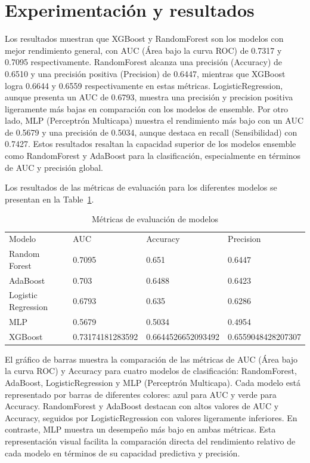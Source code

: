 \documentclass[
  number,
  preprint,
  3p,
  twocolumn]{elsarticle}
\begin{document}
\section{Experimentación y
resultados}\label{experimentaciuxf3n-y-resultados}

Los resultados muestran que XGBoost y RandomForest son los modelos con
mejor rendimiento general, con AUC (Área bajo la curva ROC) de 0.7317 y
0.7095 respectivamente. RandomForest alcanza una precisión (Accuracy) de
0.6510 y una precisión positiva (Precision) de 0.6447, mientras que
XGBoost logra 0.6644 y 0.6559 respectivamente en estas métricas.
LogisticRegression, aunque presenta un AUC de 0.6793, muestra una
precisión y precision positiva ligeramente más bajas en comparación con
los modelos de ensemble. Por otro lado, MLP (Perceptrón Multicapa)
muestra el rendimiento más bajo con un AUC de 0.5679 y una precisión de
0.5034, aunque destaca en recall (Sensibilidad) con 0.7427. Estos
resultados resaltan la capacidad superior de los modelos ensemble como
RandomForest y AdaBoost para la clasificación, especialmente en términos
de AUC y precisión global.

Los resultados de las métricas de evaluación para los diferentes modelos
se presentan en la Table~\ref{tbl-metricas}.

\begin{longtable}[]{@{}llll@{}}

\caption{\label{tbl-metricas}Métricas de evaluación de modelos}

\tabularnewline

\toprule\noalign{}
\endhead
\bottomrule\noalign{}
\endlastfoot
Modelo & AUC & Accuracy & Precision \\
Random Forest & 0.7095 & 0.651 & 0.6447 \\
AdaBoost & 0.703 & 0.6488 & 0.6423 \\
Logistic Regression & 0.6793 & 0.635 & 0.6286 \\
MLP & 0.5679 & 0.5034 & 0.4954 \\
XGBoost & 0.73174181283592 & 0.6644526652093492 & 0.6559048428207307 \\

\end{longtable}

El gráfico de barras muestra la comparación de las métricas de AUC (Área
bajo la curva ROC) y Accuracy para cuatro modelos de clasificación:
RandomForest, AdaBoost, LogisticRegression y MLP (Perceptrón Multicapa).
Cada modelo está representado por barras de diferentes colores: azul
para AUC y verde para Accuracy. RandomForest y AdaBoost destacan con
altos valores de AUC y Accuracy, seguidos por LogisticRegression con
valores ligeramente inferiores. En contraste, MLP muestra un desempeño
más bajo en ambas métricas. Esta representación visual facilita la
comparación directa del rendimiento relativo de cada modelo en términos
de su capacidad predictiva y precisión.
\end{document}
